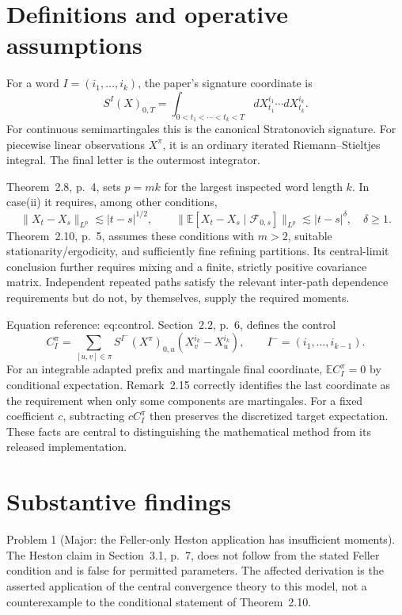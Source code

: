 \documentclass[10pt]{article}
\begin{document}
\section*{Definitions and operative assumptions}
For a word \(I=(i_1,\ldots,i_k)\), the paper’s signature coordinate is \[S^I(X)_{0,T}
 =\int_{0<t_1<\cdots<t_k<T}
 dX^{i_1}_{t_1}\cdots dX^{i_k}_{t_k}.\] For continuous semimartingales this is the canonical Stratonovich signature. For piecewise linear observations \(X^\pi\), it is an ordinary iterated Riemann–Stieltjes integral. The final letter is the outermost integrator.\par
Theorem 2.8, p. 4, sets \(p=mk\) for the largest inspected word length \(k\). In case(ii) it requires, among other conditions, \[\|X_t-X_s\|_{L^p}\lesssim |t-s|^{1/2},
 \qquad
 \|\mathbb E[X_t-X_s\mid\mathcal F_{0,s}]\|_{L^p}
       \lesssim |t-s|^\delta,\quad \delta\ge1.\] Theorem 2.10, p. 5, assumes these conditions with \(m>2\), suitable stationarity/ergodicity, and sufficiently fine refining partitions. Its central-limit conclusion further requires mixing and a finite, strictly positive covariance matrix. Independent repeated paths satisfy the relevant inter-path dependence requirements but do not, by themselves, supply the required moments.\par
Equation reference: eq:control. Section 2.2, p. 6, defines the control \[
 C_I^\pi
 =\sum_{[u,v]\in\pi} S^{I^-}(X^\pi)_{0,u}
          (X_v^{i_k}-X_u^{i_k}),\qquad I^-=(i_1,\ldots,i_{k-1}).\] For an integrable adapted prefix and martingale final coordinate, \(\mathbb EC_I^\pi=0\) by conditional expectation. Remark 2.15 correctly identifies the last coordinate as the requirement when only some components are martingales. For a fixed coefficient \(c\), subtracting \(cC_I^\pi\) then preserves the discretized target expectation. These facts are central to distinguishing the mathematical method from its released implementation.\par
\section*{Substantive findings}
Problem 1 (Major: the Feller-only Heston application has insufficient moments).  The Heston claim in Section 3.1, p. 7, does not follow from the stated Feller condition and is false for permitted parameters. The affected derivation is the asserted application of the central convergence theory to this model, not a counterexample to the conditional statement of Theorem 2.10.\par
\end{document}
